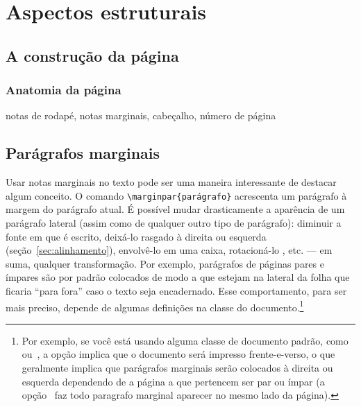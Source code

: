 \section{Aspectos estruturais}

\subsection{A construção da página}
\subsubsection{Anatomia da página}

notas de rodapé, notas marginais, cabeçalho, número de página

\subsection{Parágrafos marginais}
\newcommand{\amounttorotate}{0}\newlength{\recuo}
Usar  notas
marginais no texto pode ser uma maneira interessante de destacar algum
conceito. O comando \verb'\marginpar{parágrafo}' acrescenta um
parágrafo à margem do parágrafo atual. É possível mudar drasticamente
a aparência de um parágrafo lateral (assim como de qualquer outro tipo
de parágrafo): diminuir a fonte em que é escrito, deixá-lo rasgado à
direita ou esquerda (seção~\ref{sec:alinhamento}),
envolvê-lo em uma caixa,
rotacioná-lo%
\marginpar{%
  \ifthenelse{\isodd{\thepage}}%
             {\raggedright\renewcommand{\amounttorotate}{-90}\setlength{\recuo}{-1em}}%
             {\raggedleft\renewcommand{\amounttorotate}{90}\setlength{\recuo}{-1em}}%
  \rotatebox{\amounttorotate}{\hspace{\recuo}\footnotesize\it $\mathcal{A}$ssim.}},
etc. --- em suma, qualquer transformação. Por exemplo, parágrafos de
páginas pares e ímpares são por padrão colocados de modo a que estejam
na lateral da folha que ficaria ``para fora'' caso o texto seja
encadernado. Esse comportamento, para ser mais preciso, depende de
algumas definições na classe do documento.\footnote{Por exemplo, se
  você está usando alguma  classe de documento padrão,
  como~ ou~, a opção
   implica que o documento será impresso
  frente-e-verso, o que geralmente implica que parágrafos marginais
  serão colocados à direita ou esquerda dependendo de a página a que
  pertencem ser par ou ímpar (a opção~ faz todo
  paragrafo marginal aparecer no mesmo lado da página).}

